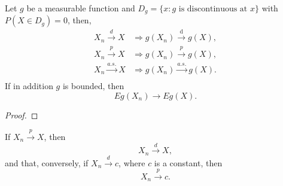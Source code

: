 \begin{theorem} \label{thm:continuous-mapping-theorem}
    Let $g$ be a measurable function and $D_g=\{x:g \text{ is discontinuous at } x\}$ with $P(X\in D_g)=0$, then,
    \begin{equation}
        \begin{aligned}
            X_{n} \stackrel{d}{\rightarrow} X    & \Rightarrow g\left(X_{n}\right) \stackrel{\mathrm{d}}{\rightarrow} g(X), \\
            X_{n} \stackrel{p}{\rightarrow} X    & \Rightarrow g\left(X_{n}\right) \stackrel{p}{\rightarrow} g(X),          \\
            X_{n} \stackrel{a.s.}{\rightarrow} X & \Rightarrow g\left(X_{n}\right) \stackrel{a.s.}{\rightarrow} g(X).       \\
        \end{aligned}
    \end{equation}
    If in addition $g$ is bounded, then
    \begin{equation}
        Eg(X_n)\rightarrow Eg(X).
    \end{equation}
\end{theorem}

\begin{proof}

\end{proof}

\begin{theorem}
    If $X_{n}\stackrel{p}{\rightarrow}X$, then
    \begin{equation}
        X_{n}\stackrel{d}{\rightarrow}X,
    \end{equation}
    and that, conversely, if $X_{n}\stackrel{d}{\rightarrow}c$, where $c$ is a constant, then
    \begin{equation}
        X_{n}\stackrel{p}{\rightarrow}c.
    \end{equation}
\end{theorem}

